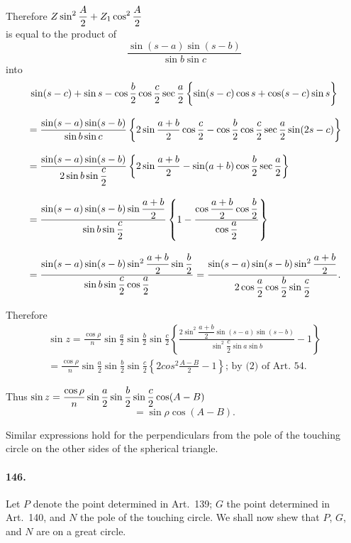 \documentclass{book}[2004/02/16]
\begin{document}
\begin{mainmatter}
\begin{spacing}{1.3}
Therefore $\hfill\displaystyle
Z \sin^2 \frac{A}{2} + Z_1 \cos^2 \frac{A}{2}
\hfill\phantom{\indent Therefore}$\\[1ex]
is equal to the product of
\[
\frac{\sin (s - a) \sin (s - b)}{\sin b \sin c}
\]
into
\begin{align*}
\multispan{2}{\hfill$\displaystyle
  \sin (s - c) + \sin s - \cos \frac{b}{2} \cos \frac{c}{2} \sec \frac{a}{2}
  \left\{\sin (s - c) \cos s + \cos (s - c) \sin s
\vphantom{\frac b2} \right\} $\hfill}\\[2ex]
& = \frac{\sin (s - a) \sin (s - b)}{\sin b \sin c}
  \left\{2 \sin \frac{a + b}{2} \cos \frac{c}{2} -
  \cos \frac{b}{2} \cos \frac{c}{2} \sec \frac{a}{2} \sin (2s - c)\right\} \\[2ex]
& = \frac{\sin (s - a) \sin (s - b)}{2 \sin b \sin \dfrac{c}{2}}
  \left\{2 \sin \frac{a + b}{2} -
  \sin (a + b) \cos \frac{b}{2} \sec \frac{a}{2}\right\} \\[2ex]
& = \frac{\sin (s - a) \sin (s - b) \sin \dfrac{a + b}{2}}
  {\sin b \sin \dfrac{c}{2}}
  \left\{1 - \frac{\cos \dfrac{a + b}{2} \cos \dfrac{b}{2}}{\cos \dfrac{a}{2}}
  \right\} \\[2ex]
& = \frac{\sin (s - a) \sin (s - b) \sin^2 \dfrac{a + b}{2} \sin \dfrac{b}{2}}
  {\sin b \sin \dfrac{c}{2} \cos \dfrac{a}{2}} =
  \frac{\sin (s - a) \sin (s - b) \sin^2 \dfrac{a + b}{2}}
  {2 \cos \dfrac{a}{2} \cos \dfrac{b}{2} \sin \dfrac{c}{2}}.
\end{align*}

Therefore
\begin{gather*}
\sin z = \frac{\cos\rho}{n} \sin\frac{a}{2} \sin\frac{b}{2} \sin\frac{c}{2} \left\{\frac{2 \sin^2\dfrac{a + b}{2}\sin(s - a)\sin(s - b)}{\sin^2\dfrac{c}{2}\sin a\sin b}- 1\right\}\\[2ex]
= \frac{\cos\rho}{n} \sin\frac{a}{2} \sin\frac{b}{2} \sin\frac{c}{2} \left\{2 cos^2\frac{A - B}{2} - 1\right\}\text{; by (2) of Art.\ 54.}
\end{gather*}

Thus $\hfill\displaystyle
  \sin z = \frac{\cos\rho}{n} \sin\frac{a}{2} \sin\frac{b}{2} \sin\frac{c}{2} \cos(A - B) \hfill\phantom{\indent Thus}$
\[
  = \sin\rho \cos(A - B).
\]

Similar expressions hold for the perpendiculars from the pole
of the touching circle on the other sides of the spherical triangle.

\paragraph{146.} Let $P$ denote the point determined in Art.\ 139; $G$ the
point determined in Art.\ 140, and $N$ the pole of the touching
circle. We shall now shew that $P$, $G$, and $N$ are on a great
circle.


\end{spacing}
\end{mainmatter}
\end{document}
